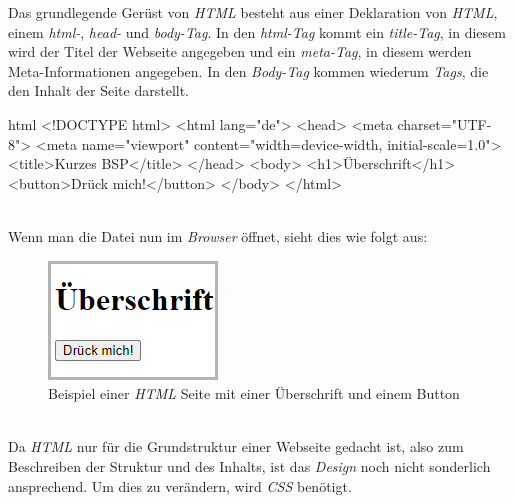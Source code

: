 		Das grundlegende Gerüst von \textit{HTML} besteht aus einer Deklaration von \textit{HTML}, einem \textit{html-}, \textit{head-} und \textit{body-Tag}. In den \textit{html-Tag} kommt ein \textit{title-Tag}, in diesem wird der Titel der Webseite angegeben und ein \textit{meta-Tag}, in diesem werden Meta-Informationen angegeben. In den \textit{Body-Tag} kommen wiederum \textit{Tags}, die den Inhalt der Seite darstellt. 
		\begin{code}{html}
			<!DOCTYPE html>
			<html lang="de">
				<head>
					<meta charset="UTF-8">
					<meta name="viewport" content="width=device-width, initial-scale=1.0">
					<title>Kurzes BSP</title>
				</head>
				<body>
					<h1>Überschrift</h1>
					<button>Drück mich!</button>
				</body>
			</html>
		\end{code}
	\label{list:htmlbsp} ~\\
		Wenn man die Datei nun im \textit{Browser} öffnet, sieht dies wie folgt aus:
		\begin{figure}[H]
			\centering
			\includegraphics[width=0.2\linewidth]{images/ldehner_study/html1}
			\caption[\textit{HTML} Beispielseite]{Beispiel einer \textit{HTML} Seite mit einer Überschrift und einem Button}
			\label{fig:htmlbsp}
		\end{figure}
		~\\
		Da \textit{HTML} nur für die Grundstruktur einer Webseite gedacht ist, also zum Beschreiben der Struktur und des Inhalts, ist das \textit{Design} noch nicht sonderlich ansprechend. Um dies zu verändern, wird \textit{CSS} benötigt.
		
